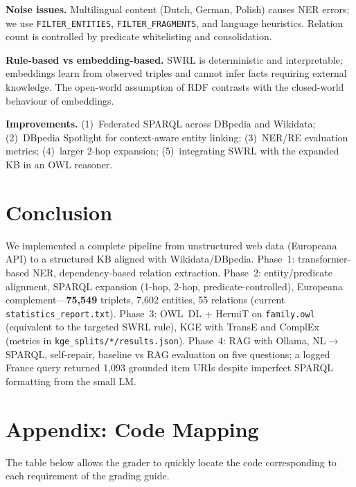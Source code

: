 \documentclass[11pt,a4paper]{article}
\begin{document}
\textbf{Noise issues.} Multilingual content (Dutch, German, Polish) causes NER errors; we use \texttt{FILTER\_ENTITIES}, \texttt{FILTER\_FRAGMENTS}, and language heuristics. Relation count is controlled by predicate whitelisting and consolidation.

\textbf{Rule-based vs embedding-based.} SWRL is deterministic and interpretable; embeddings learn from observed triples and cannot infer facts requiring external knowledge. The open-world assumption of RDF contrasts with the closed-world behaviour of embeddings.

\textbf{Improvements.} (1)~Federated SPARQL across DBpedia and Wikidata; (2)~DBpedia Spotlight for context-aware entity linking; (3)~NER/RE evaluation metrics; (4)~larger 2-hop expansion; (5)~integrating SWRL with the expanded KB in an OWL reasoner.

\section{Conclusion}

We implemented a complete pipeline from unstructured web data (Europeana API) to a structured KB aligned with Wikidata/DBpedia. Phase~1: transformer-based NER, dependency-based relation extraction. Phase~2: entity/predicate alignment, SPARQL expansion (1-hop, 2-hop, predicate-controlled), Europeana complement---\textbf{75,549} triplets, 7,602 entities, 55 relations (current \texttt{statistics\_report.txt}). Phase~3: OWL~DL + HermiT on \texttt{family.owl} (equivalent to the targeted SWRL rule), KGE with TransE and ComplEx (metrics in \texttt{kge\_splits/*/results.json}). Phase~4: RAG with Ollama, NL$\rightarrow$SPARQL, self-repair, baseline vs RAG evaluation on five questions; a logged France query returned 1,093 grounded item URIs despite imperfect SPARQL formatting from the small LM.

\section{Appendix: Code Mapping}

The table below allows the grader to quickly locate the code corresponding to each requirement of the grading guide.
\end{document}
